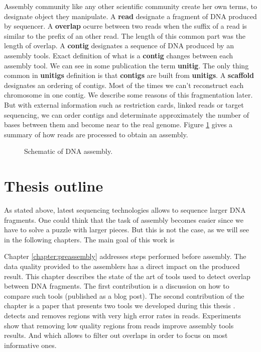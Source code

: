 \documentclass[./main.tex]{subfiles}
\begin{document}
\bigskip

Assembly community like any other scientific community create her own terms, to designate object they manipulate.%
%
A \textbf{read} designate a fragment of DNA produced by sequencer.
%
A \textbf{overlap} ocurre between two reads when the suffix of a read is similar to the prefix of an other read. The length of this common part was the length of overlap.
%
A \textbf{contig} designates a sequence of DNA produced by an assembly tools. Exact definition of what is a \textbf{contig} changes between each assembly tool. We can see in some publication the term \textbf{unitig}. The only thing common in \textbf{unitigs} definition is that \textbf{contigs} are built from \textbf{unitigs}.
%
A \textbf{scaffold} designates an ordering of contigs. Most of the times we can't reconstruct each chromosome in one contig. We describe some reasons of this fragmentation later. But with external information such as restriction cards, linked reads or target sequencing, we can order contigs and determinate approximately the number of bases between them and become near to the real genome.%
%
Figure \ref{intro:fig:assembly} gives a summary of how reads are processed to obtain an assembly.
\begin{figure}[ht]
	\centering
	\caption{Schematic of DNA assembly.}
    \label{intro:fig:assembly}
\end{figure}

\section{Thesis outline}


As stated above, latest sequencing technologies allows to sequence larger DNA fragments. One could think that the task of assembly becomes easier since we have to solve a puzzle with larger pieces. But this is not the case, as we will see in the following chapters. The main goal of this work is 


Chapter \ref{chapter:preassembly} addresses steps performed before assembly. %
The  data quality  provided to the assemblers has a direct impact on the produced result.%
This chapter describes the state of the art of tools used to detect overlap between DNA fragments. The first contribution is a discussion on how to compare such tools (published as a blog post). 
The second contribution of the chapter is a paper that presents two tools we developed during this thesis \cite{yacrd}.
\yacrd  detects and removes regions with very high error rates in reads.
Experiments show that removing  low quality regions from reads improve assembly tools results.%
And \fpa which allows to filter out overlaps in order to focus on most informative ones.
\end{document}
